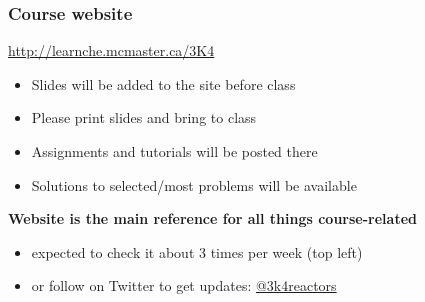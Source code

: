 \begin{frame}\frametitle{Course website}
	\begin{exampleblock}{}
		\centering 
		\href{http://learnche.mcmaster.ca/3K4}{http://learnche.mcmaster.ca/3K4}
	\end{exampleblock}
	\begin{itemize}
		\item	Slides will be added to the site before class
		\item	Please print slides and bring to class
		\item	Assignments and tutorials will be posted there
		\item	Solutions to selected/most problems will be available
	\end{itemize}
	\vspace{12pt}
	\textbf{Website is the main reference for all things course-related} 
	\begin{itemize}
		\item	expected to check it about 3 times per week {\tiny (top left)}
		\item	or follow on Twitter to get updates: \href{https://twitter.com/3k4reactors}{@3k4reactors}
	\end{itemize}
\end{frame}

